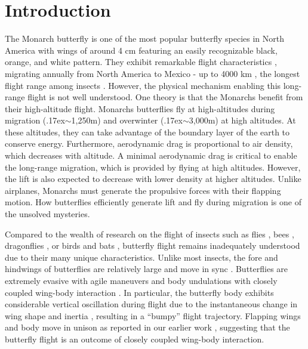 \documentclass[conf]{new-aiaa}
\begin{document}
\section{Introduction}

The Monarch butterfly is one of the most popular butterfly species in North America with wings of around 4 cm featuring an easily recognizable black, orange, and white pattern.
They exhibit remarkable flight characteristics \cite{Brower1977}, migrating annually from North America to Mexico - up to 4000 \si{km} \cite{Brower1996,Masters1988,Merlin}, the longest flight range among insects \cite{Gibo1981,Brower1996,Nin2013,Templin2000}.
However, the physical mechanism enabling this long-range flight is not well understood.
One theory is that the Monarchs benefit from their high-altitude flight.
Monarchs butterflies fly at high-altitudes during migration ({\raise.17ex\hbox{$\scriptstyle\sim$}}1,250\si{m}) and overwinter ({\raise.17ex\hbox{$\scriptstyle\sim$}}3,000\si{m}) at high altitudes.
At these altitudes, they can take advantage of the boundary layer of the earth to conserve energy.
Furthermore, aerodynamic drag is proportional to air density, which decreases with altitude.
A minimal aerodynamic drag is critical to enable the long-range migration, which is provided by flying at high altitudes.
However, the lift is also expected to decrease with lower density at higher altitudes.
Unlike airplanes, Monarchs must generate the propulsive forces with their flapping motion.
How butterflies efficiently generate lift and fly during migration is one of the unsolved mysteries.

Compared to the wealth of research on the flight of insects such as flies \cite{Dickinson1999b,Muijres2014}, bees \cite{Dillon2014,Mountcastle2013}, dragonflies \cite{Wang2005c,Jongerius2010,Wang2007,Alexander1984,Wang2005h}, or birds and bats \cite{Shyy2013}, butterfly flight remains inadequately understood due to their many unique characteristics.
Unlike most insects, the fore and hindwings of butterflies are relatively large and move in sync \cite{Betts1988}.
Butterflies are extremely evasive with agile maneuvers \cite{Dudley1991,Thomas2004a,Srygley1994,Dudley1994} and body undulations with closely coupled wing-body interaction \cite{Srygley1994,Lin2012,kang2017aiaaj}.
In particular, the butterfly body exhibits considerable vertical oscillation during flight due to the instantaneous change in wing shape and inertia \cite{Tanaka2010,Lin2012}, resulting in a ``bumpy'' flight trajectory.
Flapping wings and body move in unison as reported in our earlier work \cite{kang2017aiaaj}, suggesting that the butterfly flight is an outcome of closely coupled wing-body interaction.
\end{document}
